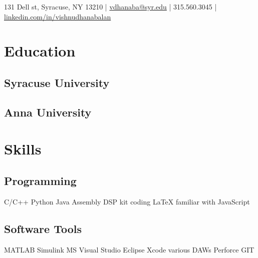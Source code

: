 \documentclass[]{deedy-resume-openfont}
\begin{document}
%
%

%
%


{131 Dell st, Syracuse, NY 13210 | 
\href{mailto:vdhanaba@syr.edu}{vdhanaba@syr.edu} | 315.560.3045 |  \url{linkedin.com/in/vishnudhanabalan}
}

%
%

\begin{minipage}[t]{0.25\textwidth} 


\section{Education} 
\subsection{Syracuse University}
\sectionsep
{}
{}
\sectionsep

\subsection{Anna University}
\sectionsep
{}
{}
\sectionsep


\section{Skills}
\subsection{Programming}
C/C++ \textbullet{}   Python \textbullet{} Java \textbullet{} Assembly
DSP kit coding \textbullet{} \LaTeX \textbullet{} familiar with JavaScript
\sectionsep
\subsection{Software Tools}
MATLAB \textbullet{} Simulink \textbullet{} MS Visual Studio \textbullet{} Eclipse \textbullet{} Xcode \textbullet{} various DAWs \textbullet{} Perforce \textbullet{} GIT
\sectionsep

\end{minipage}
\end{document}
